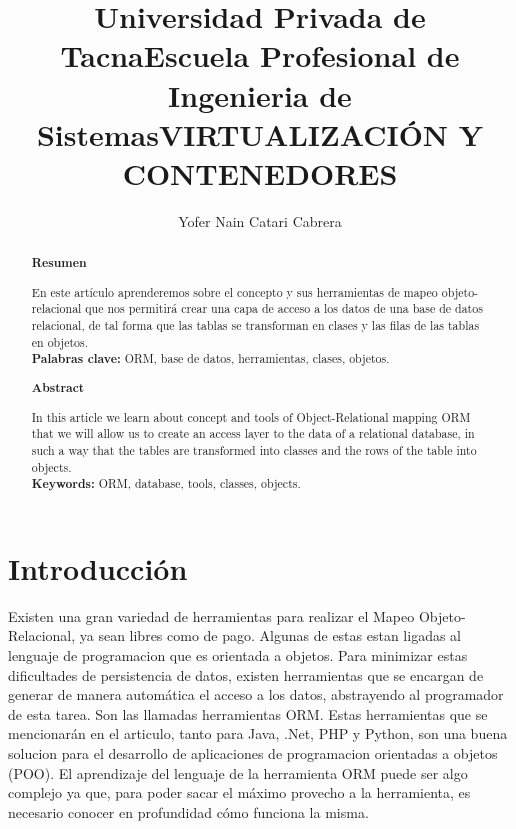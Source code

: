 \documentclass[%
 reprint,
 amsmath,amssymb,
 aps,
]{revtex4-1}
\begin{document}
\title{Universidad Privada de Tacna}
\title{Escuela Profesional de Ingenieria de Sistemas}
\title{VIRTUALIZACIÓN Y CONTENEDORES}
\author{Yofer Nain Catari Cabrera}

%

\begin{abstract}
\begin{center}
\textbf{Resumen}
\end{center}
En este artículo aprenderemos sobre el concepto y sus herramientas de mapeo objeto-relacional que nos permitirá crear una capa de acceso a los datos de una base de datos relacional, de tal forma que las tablas se transforman en clases y las filas de las tablas en objetos.\\
\textbf{Palabras clave:}   ORM, base de datos, herramientas, clases, objetos.\\

\begin{center}
\textbf{Abstract}
\end{center}
In this article we learn about concept and tools of Object-Relational mapping ORM that we will allow us to create an access layer to the data of a relational database, in such a way that the tables are transformed into classes and the rows of the table into objects.\\
\textbf{Keywords:}   ORM, database, tools, classes, objects.

\end{abstract}



\maketitle


\section {Introducción}\label{sec:1}
Existen una gran variedad de herramientas para realizar el Mapeo Objeto-Relacional, ya sean libres como de pago. Algunas de estas estan ligadas al lenguaje de programacion que es orientada a objetos. Para minimizar estas dificultades de persistencia de datos, existen herramientas que se encargan de generar de manera automática el acceso a los datos, abstrayendo al programador de esta tarea. Son las llamadas herramientas ORM.
Estas herramientas que se mencionarán en el articulo, tanto para Java, .Net, PHP y Python, son una buena solucion para el desarrollo de aplicaciones de programacion orientadas a objetos (POO). 
El aprendizaje del lenguaje de la herramienta ORM puede ser algo complejo ya que, para poder sacar el máximo provecho a la herramienta, es necesario conocer en profundidad cómo funciona la misma.
\end{document}
